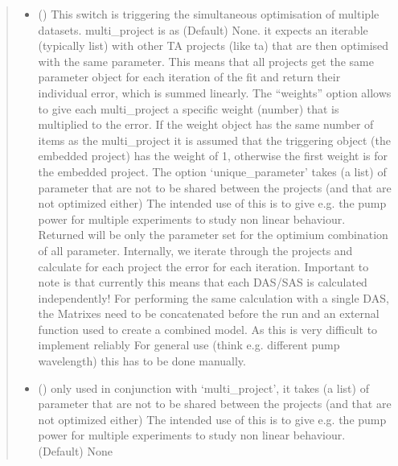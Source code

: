 \documentclass[letterpaper,10pt,english]{sphinxmanual}
\begin{document}
\begin{fulllineitems}
\begin{fulllineitems}
\begin{quote}
\begin{description}
\begin{itemize}
\item {} 
 (\sphinxstyleliteralemphasis{\sphinxupquote{ (}}\sphinxstyleliteralemphasis{\sphinxupquote{)}}\sphinxstyleliteralemphasis{\sphinxupquote{, }}) \textendash{} This switch is triggering the simultaneous optimisation of multiple datasets.
multi\_project is as (Default) None. it expects an iterable (typically list) with other
TA projects (like ta) that are then optimised with the same parameter.
This means that all projects get the same parameter object for each iteration
of the fit and return their individual error, which is summed linearly.
The “weights” option allows to give each multi\_project a specific weight (number)
that is multiplied to the error. If the weight object has the same number of items
as the multi\_project it is assumed that the triggering object (the embedded project)
has the weight of 1, otherwise the first weight is for the embedded project.
The option ‘unique\_parameter’ takes (a list) of parameter that are not
to be shared between the projects (and that are not optimized either)
The intended use of this is to give e.g. the pump power for multiple experiments to
study non linear behaviour. Returned will be only the parameter set for the optimium
combination of all parameter. Internally, we iterate through the projects and calculate
for each project the error for each iteration. Important to note is that currently this
means that each DAS/SAS is calculated independently! For performing the same calculation
with a single DAS, the Matrixes need to be concatenated before the run and an external
function used to create a combined model. As this is very difficult to implement reliably
For general use (think e.g. different pump wavelength) this has to be done manually.

\item {} 
 (\sphinxstyleliteralemphasis{\sphinxupquote{ (}}\sphinxstyleliteralemphasis{\sphinxupquote{)}}\sphinxstyleliteralemphasis{\sphinxupquote{, }}) \textendash{} only used in conjunction with ‘multi\_project’, it takes (a list) of parameter that
are not to be shared between the projects (and that are not optimized either)
The intended use of this is to give e.g. the pump power for multiple experiments
to study non linear behaviour. (Default) None


\end{itemize}
\end{description}
\end{quote}
\end{fulllineitems}
\end{fulllineitems}
\end{document}
